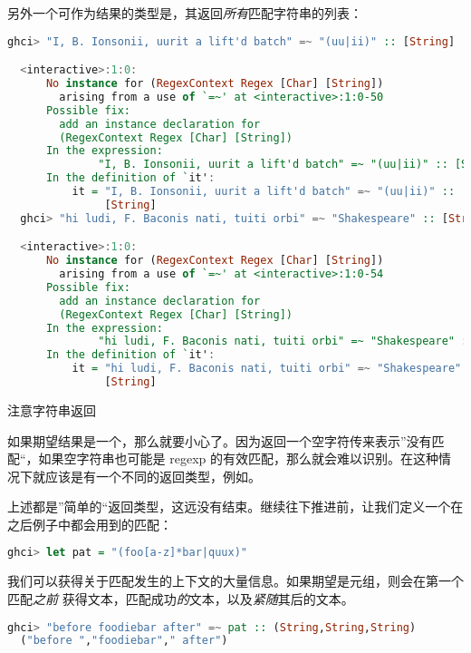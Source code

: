 \documentclass[./main.tex]{subfiles}
\begin{document}
另外一个可作为结果的类型是\acode{[String]}，其返回\textit{所有}匹配字符串的列表：

\begin{lstlisting}[language=Haskell]
  ghci> "I, B. Ionsonii, uurit a lift'd batch" =~ "(uu|ii)" :: [String]

  <interactive>:1:0:
      No instance for (RegexContext Regex [Char] [String])
        arising from a use of `=~' at <interactive>:1:0-50
      Possible fix:
        add an instance declaration for
        (RegexContext Regex [Char] [String])
      In the expression:
              "I, B. Ionsonii, uurit a lift'd batch" =~ "(uu|ii)" :: [String]
      In the definition of `it':
          it = "I, B. Ionsonii, uurit a lift'd batch" =~ "(uu|ii)" ::
               [String]
  ghci> "hi ludi, F. Baconis nati, tuiti orbi" =~ "Shakespeare" :: [String]

  <interactive>:1:0:
      No instance for (RegexContext Regex [Char] [String])
        arising from a use of `=~' at <interactive>:1:0-54
      Possible fix:
        add an instance declaration for
        (RegexContext Regex [Char] [String])
      In the expression:
              "hi ludi, F. Baconis nati, tuiti orbi" =~ "Shakespeare" :: [String]
      In the definition of `it':
          it = "hi ludi, F. Baconis nati, tuiti orbi" =~ "Shakespeare" ::
               [String]
\end{lstlisting}

\begin{anote}
  注意字符串返回

  如果期望结果是一个，那么就要小心了。因为\acode{(=~)}返回一个空字符传来表示”没有匹配“，如果空字符串也可能是
  regexp 的有效匹配，那么就会难以识别。在这种情况下就应该是有一个不同的返回类型，例如\acode{[String]}。
\end{anote}

上述都是”简单的“返回类型，这远没有结束。继续往下推进前，让我们定义一个在之后例子中都会用到的匹配：

\begin{lstlisting}[language=Haskell]
  ghci> let pat = "(foo[a-z]*bar|quux)"
\end{lstlisting}

我们可以获得关于匹配发生的上下文的大量信息。如果期望是元组，则会在第一个匹配\textit{之前}
获得文本，匹配成功\textit{的}文本，以及\textit{紧随}其后的文本。

\begin{lstlisting}[language=Haskell]
  ghci> "before foodiebar after" =~ pat :: (String,String,String)
  ("before ","foodiebar"," after")
\end{lstlisting}
\end{document}
